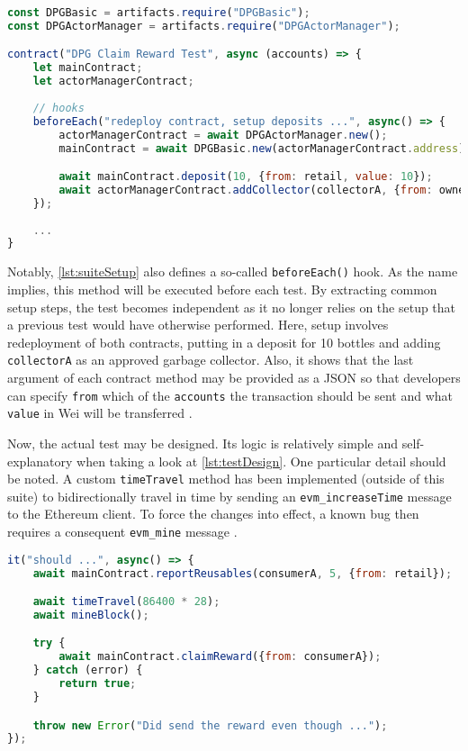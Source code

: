 \begin{lstlisting}[language=JavaScript, caption=Setup of test suite, label=lst:suiteSetup]
const DPGBasic = artifacts.require("DPGBasic");
const DPGActorManager = artifacts.require("DPGActorManager");

contract("DPG Claim Reward Test", async (accounts) => {
	let mainContract;
	let actorManagerContract;
	
	// hooks
	beforeEach("redeploy contract, setup deposits ...", async() => {
		actorManagerContract = await DPGActorManager.new();
		mainContract = await DPGBasic.new(actorManagerContract.address);

		await mainContract.deposit(10, {from: retail, value: 10});
		await actorManagerContract.addCollector(collectorA, {from: owner});
	});
	
	...
}
\end{lstlisting}

Notably, \autoref{lst:suiteSetup} also defines a so-called \texttt{beforeEach()} hook. As the name implies, this method will be executed before each test. By extracting common setup steps, the test becomes independent as it no longer relies on the setup that a previous test would have otherwise performed. Here, setup involves redeployment of both contracts, putting in a deposit for 10 bottles and adding \texttt{collectorA} as an approved garbage collector. Also, it shows that the last argument of each contract method may be provided as a JSON so that developers can specify \texttt{from} which of the \texttt{accounts} the transaction should be sent and what \texttt{value} in Wei will be transferred \cite[Interacting With Your Contracts]{truffleSuite}.

Now, the actual test may be designed. Its logic is relatively simple and self-explanatory when taking a look at \autoref{lst:testDesign}. One particular detail should be noted. A custom \texttt{timeTravel} method has been implemented (outside of this suite) to bidirectionally travel in time by sending an \texttt{evm\_increaseTime} message to the Ethereum client. To force the changes into effect, a known bug then requires a consequent \texttt{evm\_mine} message \cite{truffleAwait}.

\pagebreak

\begin{lstlisting}[language=JavaScript, caption=Example test case, label=lst:testDesign]
it("should ...", async() => {
    await mainContract.reportReusables(consumerA, 5, {from: retail});

    await timeTravel(86400 * 28);
    await mineBlock();

    try {
        await mainContract.claimReward({from: consumerA});
    } catch (error) {
        return true;
    }

    throw new Error("Did send the reward even though ...");
});
\end{lstlisting}

